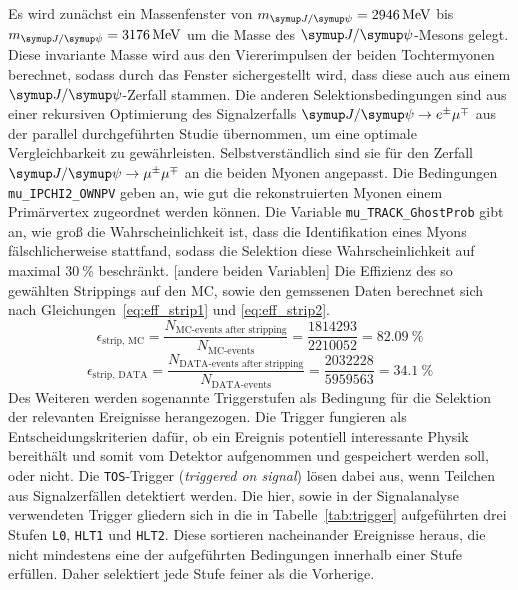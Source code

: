 Es wird zunächst ein Massenfenster von $m_{\jpsi}=\SI{2946}{\mega\electronvolt}$ bis $m_{\jpsi}=\SI{3176}{\mega\electronvolt}$ um die Masse des $\jpsi$-Mesons gelegt. Diese invariante Masse wird aus den Viererimpulsen der beiden Tochtermyonen berechnet, sodass durch das Fenster sichergestellt wird, dass diese auch aus einem $\jpsi$-Zerfall stammen. Die anderen Selektionsbedingungen sind aus einer rekursiven Optimierung des Signalzerfalls $\signal$ aus der parallel durchgeführten Studie \cite{ba-maik} übernommen, um eine optimale Vergleichbarkeit zu gewährleisten. Selbstverständlich sind sie für den Zerfall $\kontroll$ an die beiden Myonen angepasst. Die Bedingungen \texttt{mu\pm\_IPCHI2\_OWNPV} geben an, wie gut die rekonstruierten Myonen einem Primärvertex zugeordnet werden können. Die Variable \texttt{mu\pm\_TRACK\_GhostProb} gibt an, wie groß die Wahrscheinlichkeit ist, dass die Identifikation eines Myons fälschlicherweise stattfand, sodass die Selektion diese Wahrscheinlichkeit auf maximal $\SI{30}{\percent}$ beschränkt. [andere beiden Variablen] Die Effizienz des so gewählten Strippings auf den MC, sowie den gemssenen Daten berechnet sich nach Gleichungen~\ref{eq:eff_strip1} und \ref{eq:eff_strip2}.
%
\begin{equation}
  \epsilon_\text{strip, MC}=\frac{N_\text{MC-events after stripping}}{N_\text{MC-events}}=\frac{1814293}{2210052}=\SI{82.09}{\percent}
  \label{eq:eff_strip1}
\end{equation}
\begin{equation}
  \epsilon_\text{strip, DATA}=\frac{N_\text{DATA-events after stripping}}{N_\text{DATA-events}}=\frac{2032228}{5959563}=\SI{34.1}{\percent}
  \label{eq:eff_strip2}
\end{equation}
%
Des Weiteren werden sogenannte Triggerstufen als Bedingung für die Selektion der relevanten Ereignisse herangezogen. Die Trigger fungieren als Entscheidungskriterien dafür, ob ein Ereignis potentiell interessante Physik bereithält und somit vom Detektor aufgenommen und gespeichert werden soll, oder nicht. Die \texttt{TOS}-Trigger (\textit{triggered on signal}) lösen dabei aus, wenn Teilchen aus Signalzerfällen detektiert werden. Die hier, sowie in der Signalanalyse \cite{ba-maik} verwendeten Trigger gliedern sich in die in Tabelle~\ref{tab:trigger} aufgeführten drei Stufen \texttt{L0}, \texttt{HLT1} und \texttt{HLT2}. Diese sortieren nacheinander Ereignisse heraus, die nicht mindestens eine der aufgeführten Bedingungen innerhalb einer Stufe erfüllen. Daher selektiert jede Stufe feiner als die Vorherige.
%
